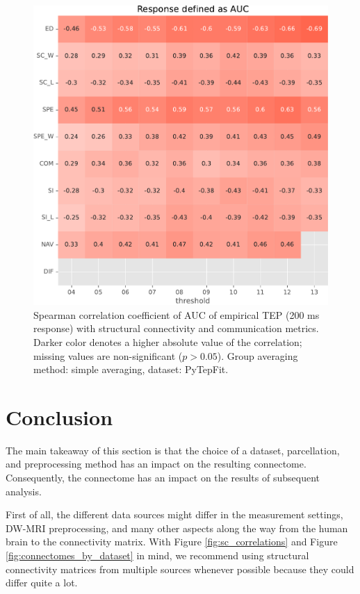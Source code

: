 \begin{figure}
    \centering
    \includegraphics[width=\textwidth]{images/nootebook_generated/tmseeg_results/empirical/200/not_over_threshold_nan/PyTepFit_simple/Response defined as AUC.pdf}
    \caption[TEPs AUC (200 ms) correlations (PyTepFit)]{Spearman correlation coefficient of AUC of empirical TEP (200 ms response) with structural connectivity and communication metrics. Darker color denotes a higher absolute value of the correlation; missing values are non-significant ($p>0.05$). Group averaging method: simple averaging, dataset: PyTepFit.}
    \label{fig:tms_auc_200_pytep_simple}
\end{figure}


\section{Conclusion}

The main takeaway of this section is that the choice of a dataset, parcellation, and preprocessing method has an impact on the resulting connectome. Consequently, the connectome has an impact on the results of subsequent analysis.

First of all, the different data sources might differ in the measurement settings, DW-MRI preprocessing, and many other aspects along the way from the human brain to the connectivity matrix. With Figure \ref{fig:sc_correlations} and Figure \ref{fig:connectomes_by_dataset} in mind, we recommend using structural connectivity matrices from multiple sources whenever possible because they could differ quite a lot.

